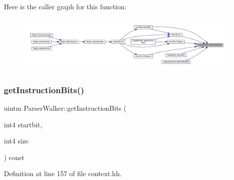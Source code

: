 Here is the caller graph for this function\+:
\nopagebreak
\begin{figure}[H]
\begin{center}
\leavevmode
\includegraphics[width=350pt]{class_parser_walker_af3212cb092a2501f0a16bf4ef9618cdb_icgraph}
\end{center}
\end{figure}
\mbox{\label{class_parser_walker_af78d60807ac439bf2af102516f257cc8}} 
\subsubsection{\texorpdfstring{getInstructionBits()}{getInstructionBits()}}
{\footnotesize\ttfamily uintm Parser\+Walker\+::get\+Instruction\+Bits (\begin{DoxyParamCaption}\item[{int4}]{startbit,  }\item[{int4}]{size }\end{DoxyParamCaption}) const\hspace{0.3cm}{\ttfamily [inline]}}



Definition at line 157 of file context.\+hh.

